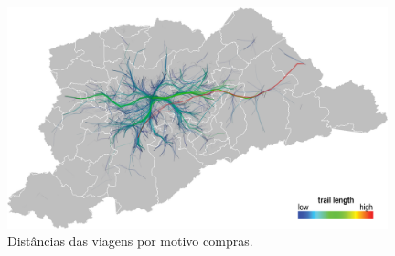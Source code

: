 \begin{figure}[!htb]
\centering
\captionsetup{justification=centering}
\includegraphics[width=0.98\textwidth]{../figuras/reason-shopping-leg.png}
\caption{Distâncias das viagens por motivo compras.\label{fig:reason-shopping}}
\end{figure}

